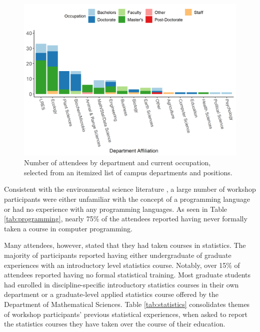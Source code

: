 \documentclass[12pt]{article}
\begin{document}
{
\begin{figure}[h!]
\centering
\includegraphics[width = \textwidth]{images/better_colors_attendance.png}
\caption{Number of attendees by department and current occupation, selected from
an itemized list of campus departments and positions.}
    \label{fig:departments}
\end{figure}
}

\quad Consistent with the environmental science literature \citep{andelman, 
hampton, hernandez, datacarpentry}, a large number of workshop participants were
either unfamiliar with the concept of a programming language or had no
experience with any programming languages. As seen in Table 
\ref{tab:programming}, nearly 75\% of the attendees reported having never
formally taken a course in computer programming.

\quad Many attendees, however, stated that they had taken courses in statistics.
The majority of participants reported having either undergraduate of graduate
experiences with an introductory level statistics course. Notably, over 15\% of
attendees reported having no formal statistical training. Most graduate students
had enrolled in discipline-specific introductory statistics courses in their own
department or a graduate-level applied statistics course offered by the
Department of Mathematical Sciences. Table \ref{tab:statistics} consolidates 
themes of workshop participants' previous statistical experiences, when asked to
report the statistics courses they have taken over the course of their education. 
\end{document}
